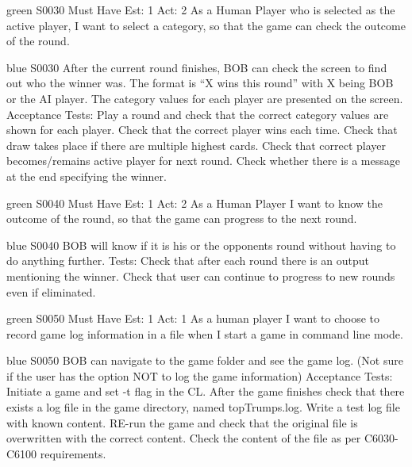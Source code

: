 
\newpage

\begin{card}{green}
{S0030}
{Must Have}
{Est: 1}
{Act: 2}
As a Human Player who is selected as the active player, I want to select a category, so that the game can check the outcome of the round.
\end{card}

\begin{card}{blue}
{S0030}{}{}{}
After the current round finishes, BOB can check the screen to find out who the winner was. 
The format is ``X wins this round'' with X being BOB or the AI player. 
The category values for each player are presented on the screen. 
Acceptance Tests: Play a round and check that the correct category values are shown for each player. 
Check that the correct player wins each time. Check that draw takes place if there are multiple highest cards. 
Check that correct player becomes/remains active player for next round. 
Check whether there is a message at the end specifying the winner.
\end{card}


\newpage

\begin{card}{green}
{S0040}
{Must Have}
{Est: 1}
{Act: 2}
As a Human Player I want to know the outcome of the round, so that the game can progress to the next round.
\end{card}

\begin{card}{blue}
{S0040}{}{}{}
BOB will know if it is his or the opponents round without having to do anything further.
Tests: Check that after each round there is an output mentioning the winner. 
Check that user can continue to progress to new rounds even if eliminated.
\end{card}


\newpage

\begin{card}{green}
{S0050}
{Must Have}
{Est: 1}
{Act: 1}
As a human player I want to choose to record game log information in a file when I start a game in command line mode.
\end{card}

\begin{card}{blue}
{S0050}{}{}{}
BOB can navigate to the game folder and see the game log. 
(Not sure if the user has the option NOT to log the game information) 
Acceptance Tests: Initiate a game and set -t flag in the CL. 
After the game finishes check that there exists a log file in the game directory, named topTrumps.log. 
Write a test log file with known content. 
RE-run the game and check that the original file is overwritten with the correct content. 
Check the content of the file as per C6030- C6100 requirements.
\end{card}

